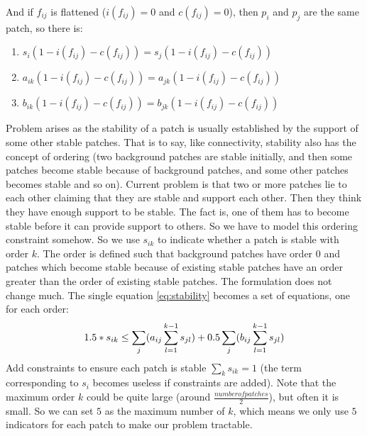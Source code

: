 \documentclass{article}
\begin{document}
And if $f_{ij}$ is flattened ($i(f_{ij}) = 0$ and $c(f_{ij}) = 0$), then $p_i$ and $p_j$ are the same patch, so there is:
\begin{enumerate}
\item $s_i(1 - i(f_{ij}) - c(f_{ij})) = s_j(1 - i(f_{ij}) - c(f_{ij}))$
\item $a_{ik}(1 - i(f_{ij}) - c(f_{ij})) = a_{jk}(1 - i(f_{ij}) - c(f_{ij}))$
\item $b_{ik}(1 - i(f_{ij}) - c(f_{ij})) = b_{jk}(1 - i(f_{ij}) - c(f_{ij}))$
\end{enumerate}

\color{blue}
Problem arises as the stability of a patch is usually established by the support of some other stable patches. That is to say, like connectivity, stability also has the concept of ordering (two background patches are stable initially, and then some patches become stable because of background patches, and some other patches becomes stable and so on). Current problem is that two or more patches lie to each other claiming that they are stable and support each other. Then they think they have enough support to be stable. The fact is, one of them has to become stable before it can provide support to others. So we have to model this ordering constraint somehow. So we use $s_{ik}$ to indicate whether a patch is stable with order $k$. The order is defined such that background patches have order $0$ and patches which become stable because of existing stable patches have an order greater than the order of existing stable patches. The formulation does not change much. The single equation \ref{eq:stability} becomes a set of equations, one for each order:
\begin{equation}
  1.5 * s_{ik} \leq \sum_j(a_{ij} \sum_{l=1}^{k-1}s_{jl}) + 0.5\sum_j(b_{ij} \sum_{l=1}^{k-1}s_{jl})\\
\end{equation}
Add constraints to ensure each patch is stable $\sum_k{s_{ik}} = 1$ (the term corresponding to $s_i$ becomes useless if constraints are added). Note that the maximum order $k$ could be quite large (around $\frac{number of patches}{2}$), but often it is small. So we can set $5$ as the maximum number of $k$, which means we only use $5$ indicators for each patch to make our problem tractable.
\color{black}
\end{document}
